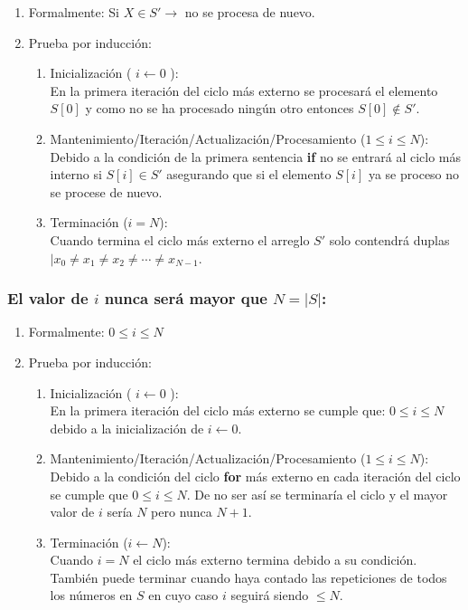 \documentclass[12pt,spanish]{article}
\theoremstyle{definition}
\begin{document}
\begin{enumerate}
\item Formalmente: Si $ X \in S' \rightarrow$ no se procesa de nuevo.
\item Prueba por inducción:
    \begin{enumerate}
    \item Inicialización ( $i \leftarrow 0 $ ):\\
        En la primera iteración del ciclo más externo se procesará el elemento $S[0]$ y como no se ha procesado ningún otro entonces $S[0] \notin S'$. 
    \item Mantenimiento/Iteración/Actualización/Procesamiento  ($ 1  \le i  \le N $):\\
         Debido a la condición de la primera sentencia \textbf{if} no se entrará al ciclo más interno si $S[i] \in S'$ asegurando que si el elemento $S[i]$ ya se proceso no se procese de nuevo.
    \item Terminación ($i = N $): \\
        Cuando termina el ciclo más externo el arreglo $S'$ solo contendrá duplas $| x_{0} \neq x_{1} \neq x_{2} \neq \cdots \neq x_{N-1}$.
    \end{enumerate}
\end{enumerate}

\subsubsection{El valor de $i$ nunca será mayor que $N = |S|$:}{}
\begin{enumerate}
\item Formalmente: $ 0  \le i  \le N $
\item Prueba por inducción:
    \begin{enumerate}
    \item Inicialización ( $i \leftarrow 0 $ ):\\
        En la primera iteración del ciclo más externo se cumple que: $ 0  \le i  \le N $ debido a la inicialización de $i \leftarrow 0$. 
    \item Mantenimiento/Iteración/Actualización/Procesamiento  ($ 1  \le i  \le N $):\\
        Debido a la condición del ciclo \textbf{for} más externo en cada iteración del ciclo se cumple que $ 0  \le i  \le N $. De no ser así se terminaría el ciclo y el mayor valor de $i$ sería $N$ pero nunca $N + 1 $.
    \item Terminación ($i \leftarrow N $): \\
        Cuando $i = N $ el ciclo más externo termina debido a su condición.\\
        También puede terminar cuando haya contado las repeticiones de todos los números en $S$ en cuyo caso $i$ seguirá siendo $\le N$.
    \end{enumerate}
\end{enumerate}
\end{document}
